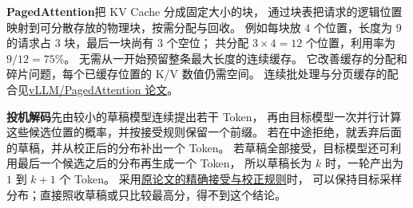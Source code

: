 \label{concept:paged-attention}%
\textbf{PagedAttention}把 KV Cache 分成固定大小的块，
通过块表把请求的逻辑位置映射到可分散存放的物理块，按需分配与回收。
例如每块放 $4$ 个位置，长度为 $9$ 的请求占 $3$ 块，最后一块尚有 $3$ 个空位；
共分配 $3\times4=12$ 个位置，利用率为 $9/12=75\%$。
无需从一开始预留整条最大长度的连续缓存。
它改善缓存的分配和碎片问题，每个已缓存位置的 K/V 数值仍需空间。
连续批处理与分页缓存的配合见\hyperref[source:paged-attention]{vLLM/PagedAttention 论文}。

\label{concept:speculative-decoding}%
\textbf{投机解码}先由较小的草稿模型连续提出若干 Token，
再由目标模型一次并行计算这些候选位置的概率，并按接受规则保留一个前缀。
若在中途拒绝，就丢弃后面的草稿，并从校正后的分布补出一个 Token。
若草稿全部接受，目标模型还可利用最后一个候选之后的分布再生成一个 Token，
所以草稿长为 $k$ 时，一轮产出为 $1$ 到 $k+1$ 个 Token。
采用\hyperref[source:speculative-decoding]{原论文的精确接受与校正规则}时，
可以保持目标采样分布；直接照收草稿或只比较最高分，得不到这个结论。
